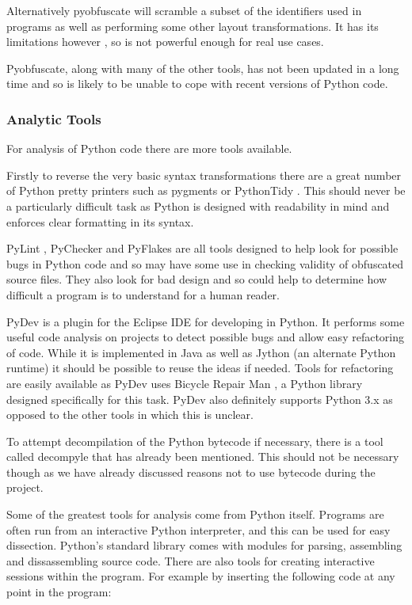 \documentclass{report}
\begin{document}
Alternatively pyobfuscate \cite{pyobf} will scramble a subset of the identifiers used in programs as well as performing
some other layout transformations. It has its limitations however \cite{pyobf}, so is not powerful enough for real use cases.

Pyobfuscate, along with many of the other tools, has not been updated in a long time and so is likely to be unable to cope with
recent versions of Python code.

\subsubsection{Analytic Tools}

For analysis of Python code there are more tools available.

Firstly to reverse the very basic syntax transformations there are a great number of Python pretty printers such as
pygments \cite{pygments} or PythonTidy \cite{pythontidy}. This should never be a particularly difficult task as Python is
designed with readability in mind and enforces clear formatting in its syntax.

PyLint \cite{pylint}, PyChecker \cite{pychecker} and PyFlakes \cite{pyflakes} are all tools designed to help look for possible
bugs in Python code and so may have some use in checking validity of obfuscated source files. They also look for bad design and so
could help to determine how difficult a program is to understand for a human reader.

PyDev \cite{pydev} is a plugin for the Eclipse IDE for developing in Python. It performs some useful code analysis on projects to detect
possible bugs and allow easy refactoring of code. While it is implemented in Java as well as Jython (an alternate Python runtime)
it should be possible to reuse the ideas if needed. Tools for refactoring are easily available as PyDev uses Bicycle Repair
Man \cite{bikerepair}, a Python library designed specifically for this task. PyDev also definitely supports Python 3.x as opposed to the
other tools in which this is unclear.

To attempt decompilation of the Python bytecode if necessary, there is a tool called decompyle \cite{decompyle} that has already been
mentioned. This should not be necessary though as we have already discussed reasons not to use bytecode during the project.

Some of the greatest  tools for analysis come from Python itself. Programs are often run from an interactive Python interpreter, and this
can be used for easy dissection. Python's standard library comes with modules for parsing, assembling and dissassembling source code.
There are also tools for creating interactive sessions within the program. For example by inserting the following code at any point
in the program:
\end{document}
